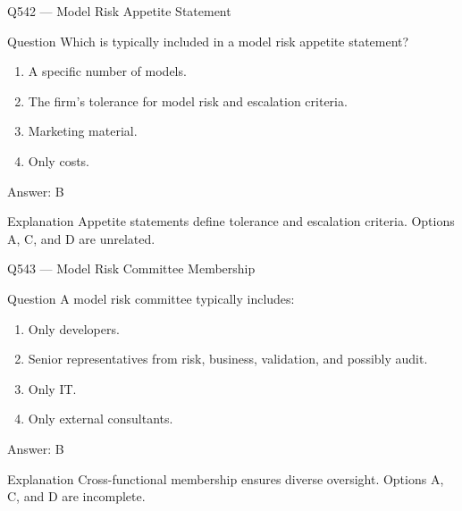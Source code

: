 \documentclass[aspectratio=169,8pt]{beamer}
\begin{document}
	\begin{frame}{Q542 --- Model Risk Appetite Statement}
		\begin{block}{Question}
			Which is typically included in a model risk appetite statement?
			\begin{enumerate}
				\item A specific number of models.
				\item The firm's tolerance for model risk and escalation criteria.
				\item Marketing material.
				\item Only costs.
			\end{enumerate}
		\end{block}
		\begin{exampleblock}{Answer: B}\end{exampleblock}
		\begin{block}{Explanation}
			Appetite statements define tolerance and escalation criteria. Options A, C, and D are unrelated.
		\end{block}
	\end{frame}
	
	\begin{frame}{Q543 --- Model Risk Committee Membership}
		\begin{block}{Question}
			A model risk committee typically includes:
			\begin{enumerate}
				\item Only developers.
				\item Senior representatives from risk, business, validation, and possibly audit.
				\item Only IT.
				\item Only external consultants.
			\end{enumerate}
		\end{block}
		\begin{exampleblock}{Answer: B}\end{exampleblock}
		\begin{block}{Explanation}
			Cross-functional membership ensures diverse oversight. Options A, C, and D are incomplete.
		\end{block}
	\end{frame}
	
\end{document}
